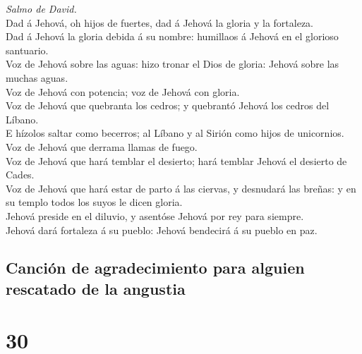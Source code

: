  \emph{Salmo de David.}\\
Dad á Jehová, oh hijos de fuertes, dad á Jehová la gloria y la
fortaleza.\\
 Dad á Jehová la gloria debida á su nombre: humillaos á
Jehová en el glorioso santuario.\\
 Voz de Jehová sobre las aguas: hizo tronar el Dios de
gloria: Jehová sobre las muchas aguas.\\
 Voz de Jehová con potencia; voz de Jehová con gloria.\\
 Voz de Jehová que quebranta los cedros; y quebrantó Jehová
los cedros del Líbano.\\
 E hízolos saltar como becerros; al Líbano y al Sirión como
hijos de unicornios.\\
 Voz de Jehová que derrama llamas de fuego.\\
 Voz de Jehová que hará temblar el desierto; hará temblar
Jehová el desierto de Cades.\\
 Voz de Jehová que hará estar de parto á las ciervas, y
desnudará las breñas: y en su templo todos los suyos le dicen gloria.\\
 Jehová preside en el diluvio, y asentóse Jehová por rey
para siempre.\\
 Jehová dará fortaleza á su pueblo: Jehová bendecirá á su
pueblo en paz.

\hypertarget{canciuxf3n-de-agradecimiento-para-alguien-rescatado-de-la-angustia}{%
\subsection{Canción de agradecimiento para alguien rescatado de la
angustia}\label{canciuxf3n-de-agradecimiento-para-alguien-rescatado-de-la-angustia}}

\hypertarget{section-29}{%
\section{30}\label{section-29}}

